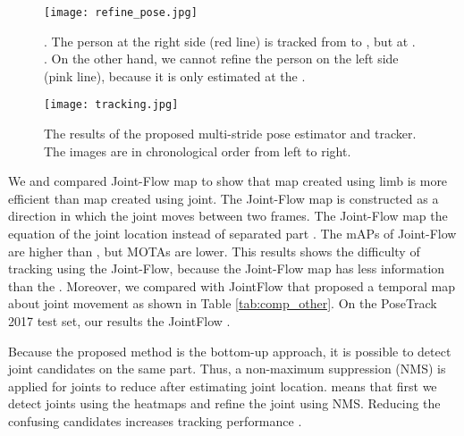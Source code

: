 \documentclass[conference]{IEEEtran}
\begin{document}
\begin{figure*}[t!]
\centering
  \texttt{[image: refine\_pose.jpg]}
  \caption{. The person at the right side  (red line) is tracked from  to , but  at . . On the other hand, we cannot refine the person on the left side (pink line), because it is only estimated at the .
 }
  \label{fig:refine}
\end{figure*}


\begin{figure*}[t!]
\centering
  \texttt{[image: tracking.jpg]}
  \caption{The  results of the proposed multi-stride pose estimator and tracker. The images are in chronological order from left to right. }
  \label{fig:tracking}
\end{figure*}

We  and compared  Joint-Flow map to show that  map created using limb is more efficient than  map created using joint. The Joint-Flow map is constructed as a direction in which the joint moves between two frames. The Joint-Flow map  the equation of  the joint location instead of separated part .
The mAPs of Joint-Flow are higher than 
, but MOTAs are lower. 
This results shows the difficulty of tracking using the Joint-Flow, because the Joint-Flow map has less information than the 
. Moreover, we compared with JointFlow \cite{doering2018joint} that proposed a temporal map about joint movement as shown in Table \ref{tab:comp_other}. On the PoseTrack 2017 test set, our results  the JointFlow \cite{doering2018joint}.



Because the proposed method is the bottom-up approach, it is possible to detect  joint candidates on the same part. 
Thus, a non-maximum suppression (NMS) is applied for joints to reduce  after estimating joint location.  means that first we detect joints using the  heatmaps and refine the joint using NMS. Reducing the confusing candidates increases tracking performance .
\end{document}
